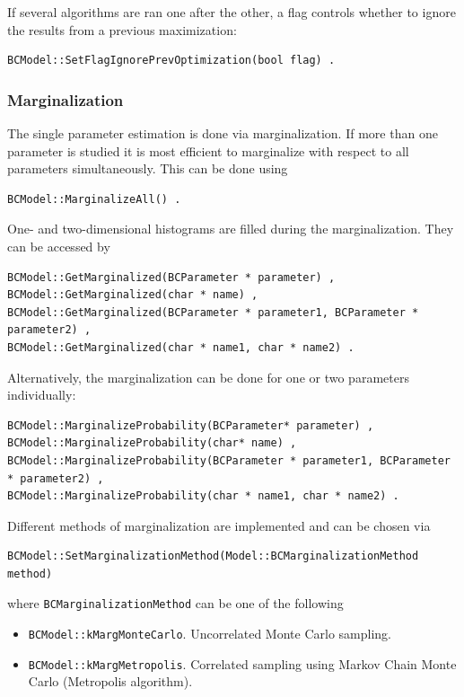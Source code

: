 \documentclass[11pt, a4paper]{article}
\begin{document}
\noindent 
If several algorithms are ran one after the other, a flag controls
whether to ignore the results from a previous maximization:
%
\begin{verbatim}
BCModel::SetFlagIgnorePrevOptimization(bool flag) .
\end{verbatim}


\subsubsection{Marginalization}
\label{subsubsection:marginalization}

\noindent
The single parameter estimation is done via marginalization. If more
than one parameter is studied it is most efficient to marginalize with
respect to all parameters simultaneously. This can be done using
%
\begin{verbatim}
BCModel::MarginalizeAll() .
\end{verbatim}

\noindent
One- and two-dimensional histograms are filled during the
marginalization. They can be accessed by
%
\begin{verbatim}
BCModel::GetMarginalized(BCParameter * parameter) ,
BCModel::GetMarginalized(char * name) ,
BCModel::GetMarginalized(BCParameter * parameter1, BCParameter * parameter2) ,
BCModel::GetMarginalized(char * name1, char * name2) .
\end{verbatim}

\noindent
Alternatively, the marginalization can be done for one or two
parameters individually:
%
\begin{verbatim}
BCModel::MarginalizeProbability(BCParameter* parameter) ,
BCModel::MarginalizeProbability(char* name) ,
BCModel::MarginalizeProbability(BCParameter * parameter1, BCParameter * parameter2) ,
BCModel::MarginalizeProbability(char * name1, char * name2) .
\end{verbatim}

\noindent
Different methods of marginalization are implemented and can be chosen
via
%
\begin{verbatim}
BCModel::SetMarginalizationMethod(Model::BCMarginalizationMethod method)
\end{verbatim}

\noindent
where \verb|BCMarginalizationMethod| can be one of the following
%
\begin{itemize}
\item \verb|BCModel::kMargMonteCarlo|. Uncorrelated Monte Carlo sampling.
\item \verb|BCModel::kMargMetropolis|. Correlated sampling using
  Markov Chain Monte Carlo (Metropolis algorithm).
\end{itemize}
\end{document}

